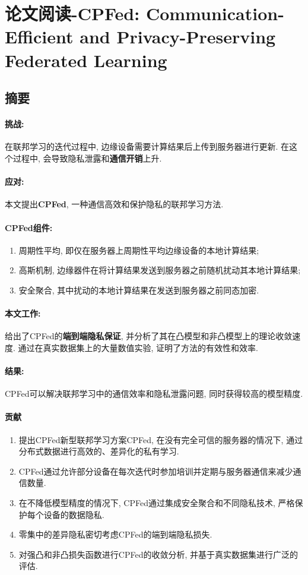 \documentclass[a4paper]{article}
\theoremstyle{definition}
\numberwithin{equation}{section}
\begin{document}
\section{论文阅读-CPFed: Communication-Efficient and Privacy-Preserving Federated Learning}

\subsection{摘要}
\paragraph{挑战:} 在联邦学习的迭代过程中, 边缘设备需要计算结果后上传到服务器进行更新. 在这个过程中, 会导致隐私泄露和\textbf{通信开销}上升. 
\paragraph{应对:} 本文提出\textbf{CPFed}, 一种通信高效和保护隐私的联邦学习方法.
\paragraph{CPFed组件:} 
\begin{enumerate}[label=(\arabic*)]  
    \item 周期性平均, 即仅在服务器上周期性平均边缘设备的本地计算结果;
    \item 高斯机制, 边缘器件在将计算结果发送到服务器之前随机扰动其本地计算结果;
    \item 安全聚合, 其中扰动的本地计算结果在发送到服务器之前同态加密. 
\end{enumerate}
\paragraph{本文工作:} 给出了CPFed的\textbf{端到端隐私保证}, 并分析了其在凸模型和非凸模型上的理论收敛速度. 通过在真实数据集上的大量数值实验, 证明了方法的有效性和效率. 
\paragraph{结果:}CPFed可以解决联邦学习中的通信效率和隐私泄露问题, 同时获得较高的模型精度.  \cite{hu2020cpfed}

\paragraph{贡献}
\begin{enumerate}
    \item 提出CPFed新型联邦学习方案CPFed, 在没有完全可信的服务器的情况下, 通过分布式数据进行高效的、差异化的私有学习. 
    \item CPFed通过允许部分设备在每次迭代时参加培训并定期与服务器通信来减少通信数量. 
    \item 在不降低模型精度的情况下, CPFed通过集成安全聚合和不同隐私技术, 严格保护每个设备的数据隐私. 
    \item 零集中的差异隐私密切考虑CPFed的端到端隐私损失. 
    \item  对强凸和非凸损失函数进行CPFed的收敛分析, 并基于真实数据集进行广泛的评估. 
\end{enumerate}
\end{document}

